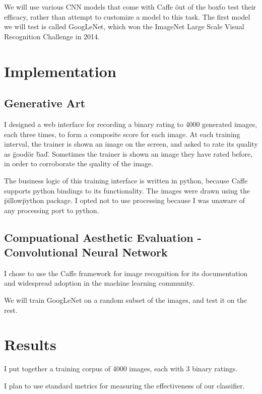 \documentclass[midd]{thesis}
\begin{document}
We will use various CNN models that come with Caffe \"out of the box\" to test their efficacy, rather than attempt to customize a model to this task. The first model we will test is called GoogLeNet, which won the ImageNet Large Scale Visual Recognition Challenge in 2014.

\chapter{Implementation}

\section{Generative Art}

I designed a web interface for recording a binary rating to 4000 generated images, each three times, to form a composite score for each image. At each training interval, the trainer is shown an image on the screen, and asked to rate its quality as \"good\" or \"bad\". Sometimes the trainer is shown an image they have rated before, in order to corroborate the quality of the image.

The business logic of this training interface is written in python, because Caffe supports python bindings to its functionality. The images were drawn using the \"pillow\" python package. I opted not to use processing because I was unaware of any processing port to python.


\section{Compuational Aesthetic Evaluation - Convolutional Neural Network}

I chose to use the Caffe framework for image recognition for its documentation and widespread adoption in the machine learning community.

We will train GoogLeNet on a random subset of the images, and test it on the rest.

\chapter{Results}

I put together a training corpus of 4000 images, each with 3 binary ratings.

I plan to use standard metrics for measuring the effectiveness of our classifier.
\end{document}
